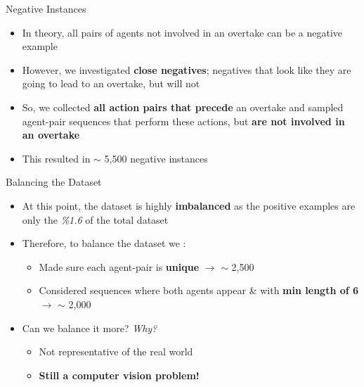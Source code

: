 \documentclass[10pt, aspectratio=169]{beamer}
\begin{document}
\begin{frame}{Negative Instances}
    \begin{itemize}
        \setlength{\itemsep}{10pt}
        \item  In theory, all pairs of agents not involved in an overtake can be a negative example
        \item However, we investigated \textbf{close negatives}; negatives that look like they are going to lead to an overtake, but will not
        \item So, we collected \textbf{all action pairs that precede} an overtake and sampled agent-pair sequences that perform these actions, but \textbf{are not involved in an overtake}
        \item This resulted in \textcolor{umBlueLighter}{$\sim$ 5,500 negative} instances
    \end{itemize}
\end{frame}


\begin{frame}{Balancing the Dataset}
    \begin{itemize}
        \setlength{\itemsep}{10pt}
        \item  At this point, the dataset is highly \textbf{imbalanced} as the positive examples are only the \textit{\%1.6} of the total dataset
        \item Therefore, to balance the dataset we :
        \vspace{5pt}
        \begin{itemize}
            \setlength{\itemsep}{3pt}
            \item Made sure each agent-pair is \textbf{unique} $\rightarrow$ \textcolor{umBlueLighter}{$\sim$ 2,500}
            \item Considered sequences where both agents appear \& with \textbf{min length of 6} $\rightarrow$ \textcolor{umBlueLighter}{$\sim$ 2,000}
        \end{itemize}
        \item Can we balance it more?  \textit{Why?}
        \vspace{5pt}
        \begin{itemize}
            \setlength{\itemsep}{3pt}
            \item Not representative of the real world
            \item \textbf{Still a computer vision problem!}
        \end{itemize}
    \end{itemize}
\end{frame}
\end{document}
